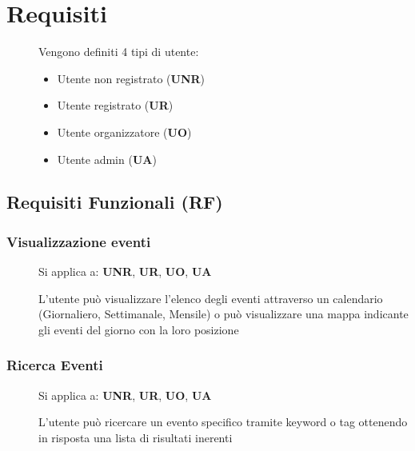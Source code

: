 \documentclass{article}
\begin{document}
\section{Requisiti}
\begin{description}
    \item[] Vengono definiti 4 tipi di utente:
          \begin{itemize}
              \item Utente non registrato (\textbf{UNR})
              \item Utente registrato (\textbf{UR})
              \item Utente organizzatore (\textbf{UO})
              \item Utente admin (\textbf{UA})
          \end{itemize}
\end{description}
\subsection{Requisiti Funzionali (RF)}
\renewcommand\thesubsubsection{RF\arabic{subsubsection}}
\subsubsection{Visualizzazione eventi} \label{rf_1}
\begin{description}
    \item[] Si applica a: \textbf{UNR}, \textbf{UR}, \textbf{UO}, \textbf{UA}
    \item[] L'utente può visualizzare l'elenco degli eventi attraverso un calendario (Giornaliero, Settimanale, Mensile) o può visualizzare una mappa indicante gli eventi del giorno con la loro posizione
\end{description}
\subsubsection{Ricerca Eventi} \label{rf_2}
\begin{description}
    \item[] Si applica a: \textbf{UNR}, \textbf{UR}, \textbf{UO}, \textbf{UA}
    \item[] L'utente può ricercare un evento specifico tramite keyword o tag ottenendo in risposta una lista di risultati inerenti
\end{description}
\end{document}
